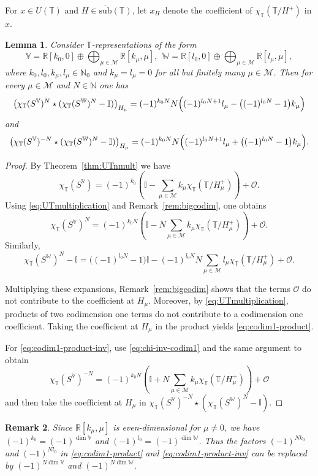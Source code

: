 \documentclass[reqno,twoside,12pt]{amsart}
\newtheorem{Remark}{Remark}[section]
\newtheorem{Lemma}[Remark]{Lemma}
\newcommand{\bI}{\mathbb{I}}
\newcommand{\bN}{\mathbb{N}}
\newcommand{\bR}{\mathbb{R}}
\newcommand{\bT}{\mathbb{T}}
\newcommand{\bV}{\mathbb{V}}
\newcommand{\bW}{\mathbb{W}}
\newcommand{\cM}{\mathcal{M}}
\newcommand{\cO}{\mathcal{O}}
\numberwithin{equation}{section} \errorcontextlines=0
\newcommand{\sub}{\overline{\mathrm{sub}}}
\begin{document}
For $x\in U(\bT)$ and $H\in\sub(\bT)$, let $x_H$ denote the coefficient of $\chi_\bT(\bT/H^+)$ in $x$.

\begin{Lemma}\label{lem:codim1-coeff}
Consider $\bT$-representations of the form
\[
\bV=\bR[k_0,0]\oplus\bigoplus_{\mu\in\cM}\bR[k_\mu,\mu],\ \
\bW=\bR[l_0,0]\oplus\bigoplus_{\mu\in\cM}\bR[l_\mu,\mu],
\]
where $k_0,l_0,k_\mu,l_\mu\in\bN_0$ and $k_\mu=l_\mu=0$ for all but finitely many $\mu\in\cM$. Then for every $\mu\in\cM$ and $N\in\bN$ one has
\begin{equation}\label{eq:codim1-product}
\bigl(\chi_\bT(S^\bV)^N\star(\chi_\bT(S^\bW)^N-\bI)\bigr)_{H_\mu}=(-1)^{k_0N}N\Bigl((-1)^{l_0N+1}l_\mu-\bigl((-1)^{l_0N}-1\bigr)k_\mu\Bigr)
\end{equation}
and
\begin{equation}\label{eq:codim1-product-inv}
\bigl(\chi_\bT(S^\bV)^{-N}\star(\chi_\bT(S^\bW)^N-\bI)\bigr)_{H_\mu}=(-1)^{k_0N}N\Bigl((-1)^{l_0N+1}l_\mu+\bigl((-1)^{l_0N}-1\bigr)k_\mu\Bigr).
\end{equation}
\end{Lemma}

\begin{proof}
By Theorem~\ref{thm:UTnmult} we have
\[
\chi_\bT(S^\bV)=(-1)^{k_0}\left(\bI-\sum_{\mu\in\cM}k_\mu\chi_\bT(\bT/H_\mu^+)\right)+\cO.
\]
Using \eqref{eq:UTmultiplication} and Remark~\ref{rem:bigcodim}, one obtains
\[
\chi_\bT(S^\bV)^N=(-1)^{k_0N}\left(\bI-N\sum_{\mu\in\cM}k_\mu\chi_\bT(\bT/H_\mu^+)\right)+\cO.
\]
Similarly,
\[
\chi_\bT(S^\bW)^N-\bI=\bigl((-1)^{l_0N}-1\bigr)\bI-(-1)^{l_0N}N\sum_{\mu\in\cM}l_\mu\chi_\bT(\bT/H_\mu^+)+\cO.
\]

Multiplying these expansions, Remark~\ref{rem:bigcodim} shows that the terms $\cO$ do not contribute to the coefficient at $H_\mu$. Moreover, by \eqref{eq:UTmultiplication}, products of two codimension one terms do not contribute to a codimension one coefficient. Taking the coefficient at $H_\mu$ in the product yields \eqref{eq:codim1-product}.

For \eqref{eq:codim1-product-inv}, use \eqref{eq:chi-inv-codim1} and the same argument to obtain
\[
\chi_\bT(S^\bV)^{-N}=(-1)^{k_0N}\left(\bI+N\sum_{\mu\in\cM}k_\mu\chi_\bT(\bT/H_\mu^+)\right)+\cO
\]
and then take the coefficient at $H_\mu$ in
$\chi_\bT(S^\bV)^{-N}\star(\chi_\bT(S^\bW)^N-\bI)$.

\end{proof}


\begin{Remark}\label{rem:codim1-dim}
Since $\bR[k_\mu,\mu]$ is even-dimensional for $\mu\neq0$, we have $(-1)^{k_0}=(-1)^{\dim\bV}$ and $(-1)^{l_0}=(-1)^{\dim\bW}$. Thus the factors $(-1)^{Nk_0}$ and $(-1)^{Nl_0}$ in \eqref{eq:codim1-product} and \eqref{eq:codim1-product-inv} can be replaced by $(-1)^{N\dim\bV}$ and $(-1)^{N\dim\bW}$.
\end{Remark}
\end{document}
